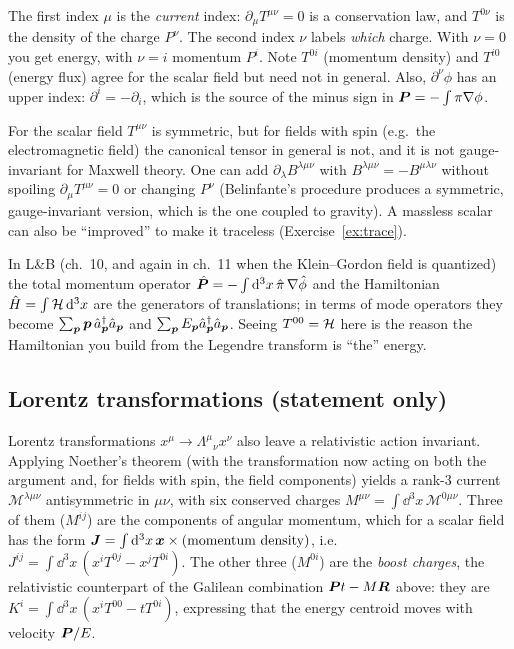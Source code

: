 \documentclass[11pt]{article}
\begin{document}
\begin{pitfall}
The first index $\mu$ is the \emph{current} index: $\partial_\mu T^{\mu\nu}=0$ is a conservation law, and $T^{0\nu}$ is the density of the charge $P^\nu$. The second index $\nu$ labels \emph{which} charge. With $\nu=0$ you get energy, with $\nu=i$ momentum $P^i$. Note $T^{0i}$ (momentum density) and $T^{i0}$ (energy flux) agree for the scalar field but need not in general. Also, $\partial^\nu\phi$ has an upper index: $\partial^i=-\partial_i$, which is the source of the minus sign in $\bm{P}=-\int\pi\nabla\phi$.
\end{pitfall}

\begin{pitfall}
For the scalar field $T^{\mu\nu}$ is symmetric, but for fields with spin (e.g.\ the electromagnetic field) the canonical tensor in general is not, and it is not gauge-invariant for Maxwell theory. One can add $\partial_\lambda B^{\lambda\mu\nu}$ with $B^{\lambda\mu\nu}=-B^{\mu\lambda\nu}$ without spoiling $\partial_\mu T^{\mu\nu}=0$ or changing $P^\nu$ (Belinfante's procedure produces a symmetric, gauge-invariant version, which is the one coupled to gravity). A massless scalar can also be ``improved'' to make it traceless (Exercise~\ref{ex:trace}).
\end{pitfall}

\begin{qftbridge}
In L\&B (ch.~10, and again in ch.~11 when the Klein--Gordon field is quantized) the total momentum operator $\hat{\bm{P}}=-\int\mathrm{d}^3x\,\hat\pi\,\nabla\hat\phi$ and the Hamiltonian $\hat H=\int\mathcal{H}\,\mathrm{d}^3x$ are the generators of translations; in terms of mode operators they become $\sum_{\bm{p}}\bm{p}\,\hat a^\dagger_{\bm{p}}\hat a_{\bm{p}}$ and $\sum_{\bm{p}}E_{\bm{p}}\hat a^\dagger_{\bm{p}}\hat a_{\bm{p}}$. Seeing $T^{00}=\mathcal{H}$ here is the reason the Hamiltonian you build from the Legendre transform is ``the'' energy.
\end{qftbridge}

\subsection{Lorentz transformations (statement only)}

Lorentz transformations $x^\mu\to\Lambda^\mu{}_\nu x^\nu$ also leave a relativistic action invariant. Applying Noether's theorem (with the transformation now acting on both the argument and, for fields with spin, the field components) yields a rank-3 current $\mathcal M^{\lambda\mu\nu}$ antisymmetric in $\mu\nu$, with six conserved charges $M^{\mu\nu}=\int\dd^3x\,\mathcal M^{0\mu\nu}$. Three of them ($M^{ij}$) are the components of angular momentum, which for a scalar field has the form $\bm{J}=\int\mathrm{d}^3x\,\bm{x}\times(\text{momentum density})$, i.e.\ $J^{ij}=\int\dd^3x\,(x^iT^{0j}-x^jT^{0i})$. The other three ($M^{0i}$) are the \emph{boost charges}, the relativistic counterpart of the Galilean combination $\bm{P}t-M\bm{R}$ above: they are $K^i=\int\dd^3x\,(x^iT^{00}-tT^{0i})$, expressing that the energy centroid moves with velocity $\bm{P}/E$.
\end{document}
